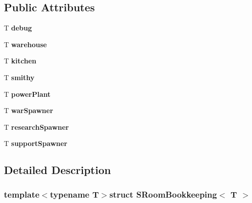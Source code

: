 \subsection*{Public Attributes}
\begin{DoxyCompactItemize}
\item 
\hypertarget{structSRoomBookkeeping_a6476f06e37d914671cef3d56bdf60190}{T {\bfseries debug}}\label{structSRoomBookkeeping_a6476f06e37d914671cef3d56bdf60190}

\item 
\hypertarget{structSRoomBookkeeping_a2d6e44a3615e17af912d02530e5bdc3f}{T {\bfseries warehouse}}\label{structSRoomBookkeeping_a2d6e44a3615e17af912d02530e5bdc3f}

\item 
\hypertarget{structSRoomBookkeeping_a7d332ac268bd7de6a427931df8d39762}{T {\bfseries kitchen}}\label{structSRoomBookkeeping_a7d332ac268bd7de6a427931df8d39762}

\item 
\hypertarget{structSRoomBookkeeping_a96facc5a3b1341859c8b87be35c5ed4f}{T {\bfseries smithy}}\label{structSRoomBookkeeping_a96facc5a3b1341859c8b87be35c5ed4f}

\item 
\hypertarget{structSRoomBookkeeping_a2a2705b2745c3d81264cddd78b5b712a}{T {\bfseries power\-Plant}}\label{structSRoomBookkeeping_a2a2705b2745c3d81264cddd78b5b712a}

\item 
\hypertarget{structSRoomBookkeeping_a305f67fb01987b69b3d93098197b4036}{T {\bfseries war\-Spawner}}\label{structSRoomBookkeeping_a305f67fb01987b69b3d93098197b4036}

\item 
\hypertarget{structSRoomBookkeeping_a7c14a4b658fa565fcbca03fb0354a26f}{T {\bfseries research\-Spawner}}\label{structSRoomBookkeeping_a7c14a4b658fa565fcbca03fb0354a26f}

\item 
\hypertarget{structSRoomBookkeeping_a2a6dcbdac4f993af853f406f0344a0e6}{T {\bfseries support\-Spawner}}\label{structSRoomBookkeeping_a2a6dcbdac4f993af853f406f0344a0e6}

\end{DoxyCompactItemize}


\subsection{Detailed Description}
\subsubsection*{template$<$typename T$>$struct S\-Room\-Bookkeeping$<$ T $>$}

